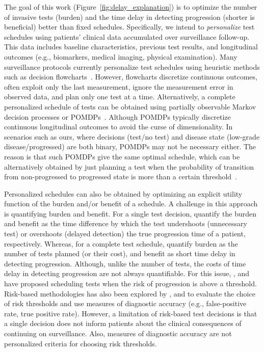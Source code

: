 The goal of this work (Figure~\ref{fig:delay_explanation}) is to optimize the number of invasive tests (burden) and the time delay in detecting progression (shorter is beneficial) better than fixed schedules. Specifically, we intend to \emph{personalize} test schedules using patients' clinical data accumulated over surveillance follow-up. This data includes baseline characteristics, previous test results, and longitudinal outcomes (e.g., biomarkers, medical imaging, physical examination). Many surveillance protocols currently personalize test schedules using heuristic methods such as decision flowcharts~\citep{bokhorst2015compliance,weusten2017endoscopic}. However, flowcharts discretize continuous outcomes, often exploit only the last measurement, ignore the measurement error in observed data, and plan only one test at a time. Alternatively, a complete personalized schedule of tests can be obtained using partially observable Markov decision processes or POMDPs~\citep{alagoz2010operations,steimle2017markov}. Although POMDPs typically discretize continuous longitudinal outcomes to avoid the curse of dimensionality. In scenarios such as ours, where decisions (test/no test) and disease state (low-grade disease/progressed) are both binary, POMDPs may not be necessary either. The reason is that such POMDPs give the same optimal schedule, which can be alternatively obtained by just planning a test when the probability of transition from non-progressed to progressed state is more than a certain threshold~\cite[see][Equation~1]{vickers2006decision}. 

Personalized schedules can also be obtained by optimizing an explicit utility function of the burden and/or benefit of a schedule. A challenge in this approach is quantifying burden and benefit. For a single test decision, \citet{tomer2019personalizedbiometrics} quantify the burden and benefit as the time difference by which the test undershoots (unnecessary test) or overshoots (delayed detection) the true progression time of a patient, respectively. Whereas, for a complete test schedule, \citet{bebu2017optimal} quantify burden as the number of tests planned (or their cost), and benefit as short time delay in detecting progression. Although, unlike the number of tests, the costs of time delay in detecting progression are not always quantifiable. For this issue, \citet{bebu2017optimal}, and \citet{vickers2006decision} have proposed scheduling tests when the risk of progression is above a threshold. Risk-based methodologies has also been explored by \citet{rizopoulos2015personalized}, and to evaluate the choice of risk thresholds \citet{wang2019learning} and \citet{tomer2019personalized} use measures of diagnostic accuracy (e.g., false-positive rate, true positive rate). However, a limitation of risk-based test decisions is that a single decision does not inform patients about the clinical consequences of continuing on surveillance. Also, measures of diagnostic accuracy are not personalized criteria for choosing risk thresholds.

